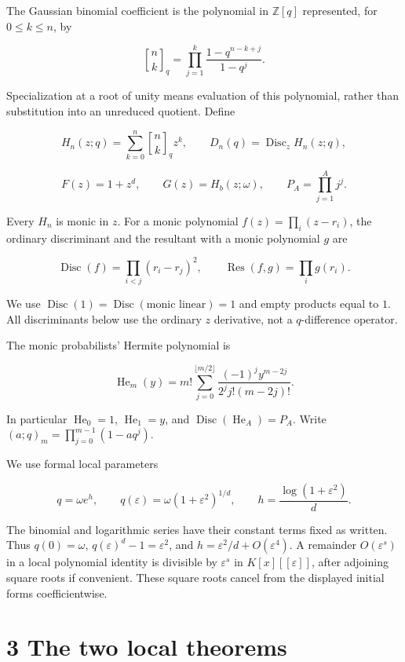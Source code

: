 \documentclass[
  11pt,
]{article}
\begin{document}
The Gaussian binomial coefficient is the polynomial in \(\mathbb Z[q]\)
represented, for \(0\leq k\leq n\), by

\[
\genfrac{[}{]}{0pt}{}{n}{k}_q=\prod_{j=1}^{k}\frac{1-q^{n-k+j}}{1-q^j}.
\]

Specialization at a root of unity means evaluation of this polynomial,
rather than substitution into an unreduced quotient. Define

\[
H_n(z;q)=\sum_{k=0}^{n}\genfrac{[}{]}{0pt}{}{n}{k}_q z^k,
\qquad D_n(q)=\operatorname{Disc}_z H_n(z;q),
\]

\[
F(z)=1+z^d,\qquad G(z)=H_b(z;\omega),\qquad
P_A=\prod_{j=1}^{A}j^j.
\]

Every \(H_n\) is monic in \(z\). For a monic polynomial
\(f(z)=\prod_i(z-r_i)\), the ordinary discriminant and the resultant
with a monic polynomial \(g\) are

\[
\operatorname{Disc}(f)=\prod_{i<j}(r_i-r_j)^2,
\qquad \operatorname{Res}(f,g)=\prod_i g(r_i).
\]

We use
\(\operatorname{Disc}(1)=\operatorname{Disc}(\text{monic linear})=1\)
and empty products equal to \(1\). All discriminants below use the
ordinary \(z\) derivative, not a \(q\)-difference operator.

The monic probabilists' Hermite polynomial is

\[
\operatorname{He}_m(y)=m!\sum_{j=0}^{\lfloor m/2\rfloor}
\frac{(-1)^j y^{m-2j}}{2^j j!(m-2j)!}.
\]

In particular \(\operatorname{He}_0=1\), \(\operatorname{He}_1=y\), and
\(\operatorname{Disc}(\operatorname{He}_A)=P_A\). Write
\((a;q)_m=\prod_{j=0}^{m-1}(1-aq^j)\).

We use formal local parameters

\[
q=\omega e^h,\qquad q(\varepsilon)=\omega(1+\varepsilon^2)^{1/d},
\qquad h=\frac{\log(1+\varepsilon^2)}{d}.
\]

The binomial and logarithmic series have their constant terms fixed as
written. Thus \(q(0)=\omega\), \(q(\varepsilon)^d-1=\varepsilon^2\), and
\(h=\varepsilon^2/d+O(\varepsilon^4)\). A remainder \(O(\varepsilon^s)\)
in a local polynomial identity is divisible by \(\varepsilon^s\) in
\(K[x][[\varepsilon]]\), after adjoining square roots if convenient.
These square roots cancel from the displayed initial forms
coefficientwise.

\section{3 The two local theorems}\label{the-two-local-theorems}
\end{document}
